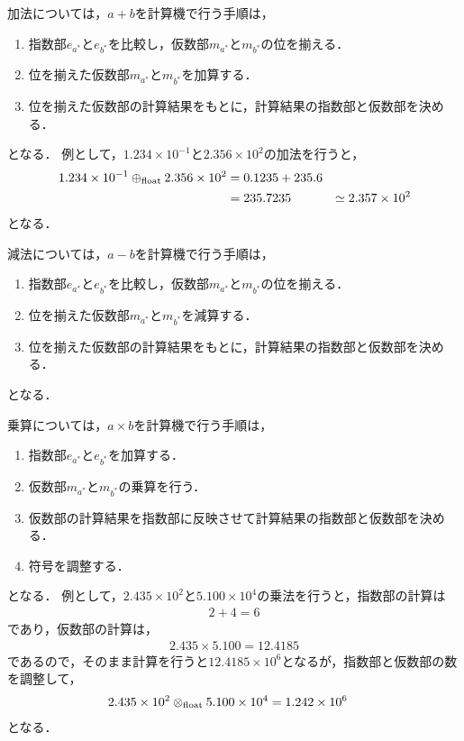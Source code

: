 加法については，$a + b$を計算機で行う手順は，
\begin{enumerate}
    \item 指数部$e_{a^{\ast}}$と$e_{b^{\ast}}$を比較し，仮数部$m_{a^{\ast}}$と$m_{b^{\ast}}$の位を揃える．
    \item 位を揃えた仮数部$m_{a^{\ast}}$と$m_{b^{\ast}}$を加算する．
    \item 位を揃えた仮数部の計算結果をもとに，計算結果の指数部と仮数部を決める．
\end{enumerate}
となる．
例として，$1.234 \times 10^{-1}$と$2.356 \times 10^{2}$の加法を行うと，
\begin{align*}
    1.234 \times 10^{-1} \oplus_{\mathrm{float}} 2.356 \times 10^{2} &= 0.1235 + 235.6 \\
    &= 235.7235 
    &\simeq 2.357 \times 10^{2}
\end{align*}
となる．

減法については，$a - b$を計算機で行う手順は，
\begin{enumerate}
    \item 指数部$e_{a^{\ast}}$と$e_{b^{\ast}}$を比較し，仮数部$m_{a^{\ast}}$と$m_{b^{\ast}}$の位を揃える．
    \item 位を揃えた仮数部$m_{a^{\ast}}$と$m_{b^{\ast}}$を減算する．
    \item 位を揃えた仮数部の計算結果をもとに，計算結果の指数部と仮数部を決める．
\end{enumerate}
となる．

乗算については，$a \times b$を計算機で行う手順は，
\begin{enumerate}
    \item 指数部$e_{a^{\ast}}$と$e_{b^{\ast}}$を加算する．
    \item 仮数部$m_{a^{\ast}}$と$m_{b^{\ast}}$の乗算を行う．
    \item 仮数部の計算結果を指数部に反映させて計算結果の指数部と仮数部を決める．
    \item 符号を調整する．
\end{enumerate}
となる．
例として，$2.435 \times 10^2$と$5.100 \times 10^4$の乗法を行うと，指数部の計算は
\begin{align*}
    2 + 4 = 6
\end{align*}
であり，仮数部の計算は，
\begin{align*}
    2.435 \times 5.100 = 12.4185
\end{align*}
であるので，そのまま計算を行うと$12.4185 \times 10^6$となるが，指数部と仮数部の数を調整して，
\begin{align*}
    2.435 \times 10^2 \otimes_{\mathrm{float}} 5.100 \times 10^4 &= 1.242 \times 10^6
\end{align*}
となる．

